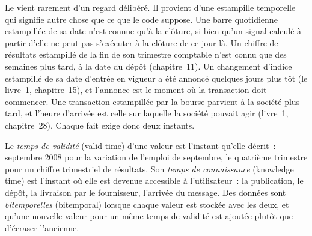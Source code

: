 Le  vient rarement d'un regard délibéré. Il provient d'une estampille temporelle qui signifie autre chose que ce que le code
suppose. Une barre quotidienne estampillée de sa date n'est connue qu'à la clôture, si bien qu'un signal calculé à partir d'elle ne peut pas
s'exécuter à la clôture de ce jour-là. Un chiffre de résultats estampillé de la fin de son trimestre comptable n'est connu que des semaines plus tard, à la date du dépôt (chapitre~11).
Un changement d'indice estampillé de sa date d'entrée en vigueur a été annoncé quelques jours plus tôt (le livre~1, chapitre~15), et
l'annonce est le moment où la transaction doit commencer. Une transaction estampillée par la bourse parvient à la société plus tard, et
l'heure d'arrivée est celle sur laquelle la société pouvait agir (livre~1, chapitre~28). Chaque fait exige donc deux instants.

\begin{definition}\label{def:rs:point-in-time-data-and-the-biases:bitemporal}
Le \emph{temps de validité} (valid time) d'une valeur est l'instant qu'elle décrit~: septembre 2008 pour la variation de l'emploi de septembre, le
quatrième trimestre pour un chiffre trimestriel de résultats. Son \emph{temps de connaissance} (knowledge time) est l'instant où elle est devenue accessible à
l'utilisateur~: la publication, le dépôt, la livraison par le fournisseur, l'arrivée du message. Des données sont \emph{bitemporelles} (bitemporal)
lorsque chaque valeur est stockée avec les deux, et qu'une nouvelle valeur pour un même temps de validité est ajoutée plutôt que d'écraser l'ancienne.
\end{definition}

